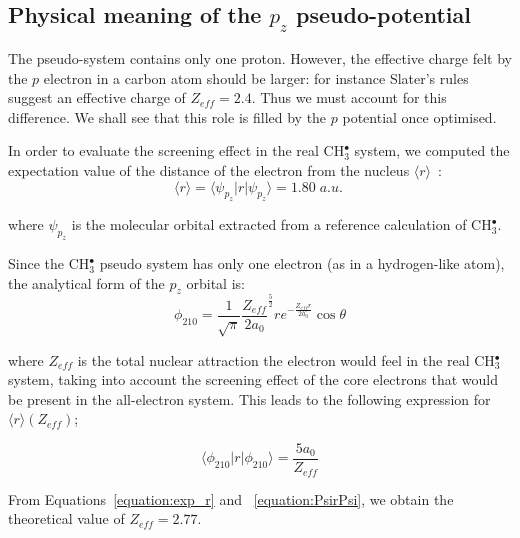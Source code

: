 \documentclass[12pt]{article}
\begin{document}
\subsection*{\sffamily \large Physical meaning of the \(p_{z}\) pseudo-potential} \label{minimalpotguess}

The pseudo-system contains only one proton. However, the effective charge felt by the $p$ electron in a carbon atom should be larger: for instance Slater's rules suggest an effective charge of $Z_{eff}=2.4$. Thus we must account for this difference. We shall see that this role is filled by the $p$ potential once optimised. 

In order to evaluate the screening effect in the real CH\(^{\bullet}_{3}\) system, we computed the expectation value of the distance of the electron from the nucleus \( \langle r \rangle \)~:
\begin{equation}
\langle r \rangle = \langle \psi_{p_{z}} | r | \psi_{p_{z}} \rangle = 1.80\;a.u.\
\label{equation:exp_r}
\end{equation}

where \(\psi_{p_{z}}\) is the molecular orbital extracted from a reference calculation of CH\(^{\bullet}_{3}\). 

Since the CH\(^{\bullet}_{3}\) pseudo system has only one electron (as in a hydrogen-like atom), 
the analytical form of the \(p_{z}\) orbital is:~\cite{me_structure_theory} 
\begin{equation}
\label{equation:analyticalpz}
\phi_{210} = \frac{1}{\sqrt{\pi}} \frac{Z_{eff}}{2a_{0}} ^{\frac{5}{2}} re^{-\frac{Z_{eff}r}{2a_{0}}} \cos \theta
\end{equation}

where \(Z_{eff}\) is the total nuclear attraction the electron 
would feel in the real CH\(^{\bullet}_{3}\) system, taking into account the screening effect of the core electrons that would be 
present in the all-electron system.
This leads to the following expression for \( \langle r \rangle (Z_{eff}) \); 

\begin{equation}
\label{equation:PsirPsi}
\langle \phi_{210} | r | \phi_{210} \rangle = \frac{5a_{0}}{Z_{eff}}
\end{equation}

From Equations~\ref{equation:exp_r} and ~\ref{equation:PsirPsi}, we obtain the theoretical value of \(Z_{eff} = 2.77\).
\end{document}
